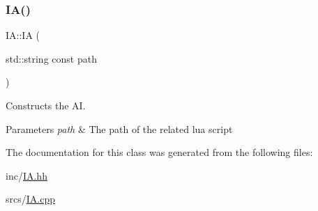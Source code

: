 \subsubsection{\texorpdfstring{I\+A()}{IA()}}
{\footnotesize\ttfamily I\+A\+::\+IA (\begin{DoxyParamCaption}\item[{std\+::string const}]{path }\end{DoxyParamCaption})}



Constructs the AI. 


\begin{DoxyParams}{Parameters}
{\em path} & The path of the related lua script \\
\hline
\end{DoxyParams}


The documentation for this class was generated from the following files\+:\begin{DoxyCompactItemize}
\item 
inc/\hyperlink{_i_a_8hh}{I\+A.\+hh}\item 
srcs/\hyperlink{_i_a_8cpp}{I\+A.\+cpp}\end{DoxyCompactItemize}

